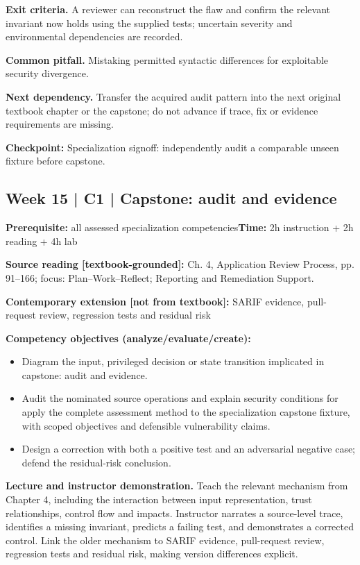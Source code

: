 \documentclass[10pt,letterpaper]{article}
\begin{document}
\textbf{Exit criteria.} A reviewer can reconstruct the flaw and confirm the relevant invariant now holds using the supplied tests; uncertain severity and environmental dependencies are recorded.

\textbf{Common pitfall.} Mistaking permitted syntactic differences for exploitable security divergence.

\textbf{Next dependency.} Transfer the acquired audit pattern into the next original textbook chapter or the capstone; do not advance if trace, fix or evidence requirements are missing.

\begin{historynote}\textbf{Checkpoint:} Specialization signoff: independently audit a comparable unseen fixture before capstone.\end{historynote}
\subsection{Week 15 | C1 | Capstone: audit and evidence}
\textbf{Prerequisite:} all assessed specialization competencies\hfill\textbf{Time:} 2h instruction + 2h reading + 4h lab

\textbf{Source reading [textbook-grounded]:} Ch. 4, Application Review Process, pp. 91--166; focus: Plan--Work--Reflect; Reporting and Remediation Support.

\textbf{Contemporary extension [not from textbook]:} SARIF evidence, pull-request review, regression tests and residual risk

\textbf{Competency objectives (analyze/evaluate/create):}
\begin{itemize}[leftmargin=*,itemsep=2pt]
\item Diagram the input, privileged decision or state transition implicated in capstone: audit and evidence.
\item Audit the nominated source operations and explain security conditions for apply the complete assessment method to the specialization capstone fixture, with scoped objectives and defensible vulnerability claims.
\item Design a correction with both a positive test and an adversarial negative case; defend the residual-risk conclusion.
\end{itemize}
\textbf{Lecture and instructor demonstration.} Teach the relevant mechanism from Chapter 4, including the interaction between input representation, trust relationships, control flow and impacts. Instructor narrates a source-level trace, identifies a missing invariant, predicts a failing test, and demonstrates a corrected control. Link the older mechanism to SARIF evidence, pull-request review, regression tests and residual risk, making version differences explicit.
\end{document}
